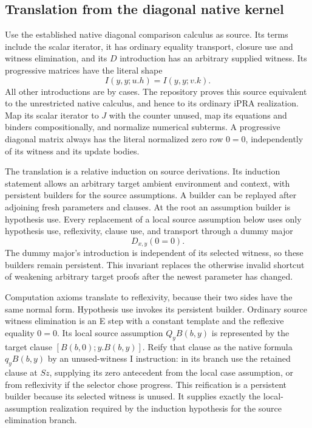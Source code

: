 \subsection{Translation from the diagonal native kernel}

Use the established native diagonal comparison calculus as source.
Its terms include the scalar iterator, it has ordinary equality transport,
closure use and witness elimination, and its $D$ introduction has an
arbitrary supplied witness.  Its progressive matrices have the literal
shape
\[
                   I(y,y;u.h)=I(y,y;v.k).
\]
All other introductions are by cases.  The repository proves this source
equivalent to the unrestricted native calculus, and hence to its ordinary
iPRA realization.  Map its scalar iterator to $J$ with the counter unused,
map its equations and binders compositionally, and normalize numerical
subterms.  A progressive diagonal matrix always has the literal normalized
zero row $0=0$, independently of its witness and its update bodies.

The translation is a relative induction on source derivations.  Its
induction statement allows an arbitrary target ambient environment and
context, with persistent builders for the source assumptions.  A builder
can be replayed after adjoining fresh parameters and clauses.  At the
root an assumption builder is hypothesis use.  Every replacement of a
local source assumption below uses only hypothesis use, reflexivity,
clause use, and transport through a dummy major
\[
                              D_{x,y}(0=0).
\]
The dummy major's introduction is independent of its selected witness,
so these builders remain persistent.  This invariant replaces the
otherwise invalid shortcut of weakening arbitrary target proofs after
the newest parameter has changed.

Computation axioms translate to reflexivity, because their two sides
have the same normal form.  Hypothesis use invokes its persistent builder.
Ordinary source witness elimination is an E step with a constant template
and the reflexive equality $0=0$.  Its local source assumption $Q_yB(b,y)$
is represented by the target clause $[B(b,0);y.B(b,y)]$.  Reify that clause
as the native formula $q_yB(b,y)$ by an unused-witness I instruction:
in its branch use the retained clause at $Sz$, supplying its zero antecedent
from the local case assumption, or from reflexivity if the selector chose
progress.  This reification is a persistent builder because its selected
witness is unused.  It supplies exactly the local-assumption realization
required by the induction hypothesis for the source elimination branch.

